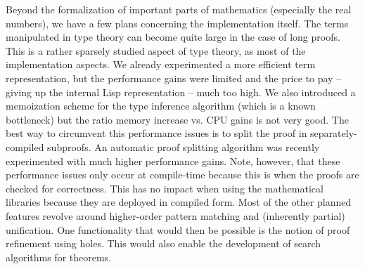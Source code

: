 \documentclass{styles/sig-alternate-05-2015}
\begin{document}
Beyond the formalization of important parts of mathematics (especially the real numbers), we have a few plans concerning
the implementation itself. The terms manipulated in type theory can become quite large in the case of long proofs.
This is a rather sparsely studied aspect of type theory, as most of the implementation aspects. We already experimented
a more efficient term representation, but the performance gains were limited and the price to pay -- giving up the
internal Lisp representation -- much too high. We also introduced a memoization scheme for the type inference algorithm
(which is a known bottleneck) but the ratio memory increase vs. CPU gains is not very good. The best way to circumvent
this performance issues is to split the proof in separately-compiled subproofs. An automatic proof splitting algorithm
was recently experimented with much higher performance gains. Note, however, that these performance issues only occur at compile-time because this is when the proofs are
checked for correctness. This has no impact when using the mathematical libraries because they are deployed in compiled form. Most of the other planned features revolve
around higher-order pattern matching and (inherently partial) unification. One functionality that would then be possible is the
 notion of proof refinement using holes. This would also enable the development of search algorithms for theorems.

\newpage
 


\end{document}
